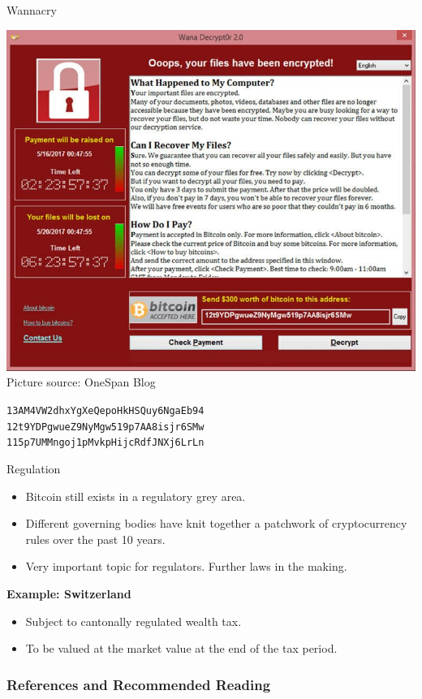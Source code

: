 \documentclass[]{beamer}
\begin{document}
\begin{frame}{Wannacry}
	\begin{center}
		\includegraphics[scale=0.28]{../assets/images/wannacry} \\
		\footnotesize{Picture source: OneSpan Blog}\\
		\vspace{1em}
	\begin{small}
	\texttt{13AM4VW2dhxYgXeQepoHkHSQuy6NgaEb94} \link \href{https://blockstream.info/address/13AM4VW2dhxYgXeQepoHkHSQuy6NgaEb94}{} \\
	\texttt{12t9YDPgwueZ9NyMgw519p7AA8isjr6SMw} \link \href{https://blockstream.info/address/12t9YDPgwueZ9NyMgw519p7AA8isjr6SMw}{} \\
	\texttt{115p7UMMngoj1pMvkpHijcRdfJNXj6LrLn} \link \href{https://blockstream.info/address/115p7UMMngoj1pMvkpHijcRdfJNXj6LrLn} {} \\
	\end{small}
	\end{center}
\end{frame}


\begin{frame}{Regulation}
\begin{itemize}
	\item Bitcoin still exists in a regulatory grey area.
	\item Different governing bodies have knit together a patchwork of cryptocurrency rules over the past 10 years. 
	\item Very important topic for regulators. Further laws in the making.
\end{itemize}
\vspace{1em}
\textbf{Example: Switzerland}
\begin{itemize}
	\item Subject to cantonally regulated wealth tax.
	\item To be valued at the market value at the end of the tax period.
\end{itemize}

\end{frame}

\begin{frame}%
\frametitle{References and Recommended Reading}
	
	
\end{frame}
\end{document}

